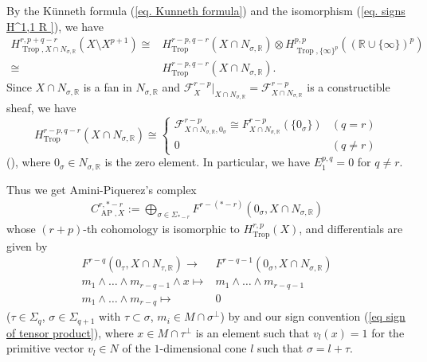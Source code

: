 \documentclass[12pt,a4]{amsart}
\def\R{\mathbb{R}}
\def\F{\mathscr{F}}
\def\AP{\mathop{\mathrm{AP}}\nolimits}
\def\Trop{\mathop{\mathrm{trop}}\nolimits}
\def\Trop{\mathop{\mathrm{Trop}}\nolimits}
\numberwithin{equation}{section}
\numberwithin{figure}{section}
\begin{document}
     By the K\"{u}nneth formula (\ref{eq. Kunneth formula}) 
     and the isomorphism (\ref{eq. signs H^1,1 R }), we have 
    \begin{align*}
         H^{r, p+q-r}_{\Trop, X \cap N_{\sigma,\R}  } 
          (X \setminus X^{p+1})   
          \cong  &
          H^{r-p, q-r}_{\Trop} ( X \cap N_{\sigma,\R}) 
          \otimes 
          H^{p, p}_{\Trop, \{ \infty \}^p } 
            (  ( \R \cup \{ \infty \} )^p ) \\
          \cong &
          H^{r-p, q-r}_{\Trop} ( X \cap N_{\sigma,\R}) 
            .
    \end{align*}
  Since $X \cap N_{\sigma,\R}$ is a fan in $N_{\sigma,\R}$ 
    and 
    $\F^{r-p}_X |_{X \cap N_{\sigma,\R}} 
       = \F^{r-p}_{X \cap N_{\sigma,\R}}$ is a constructible sheaf, 
    we have 
          $$H^{r-p, q-r}_{\Trop} ( X \cap N_{\sigma,\R}) 
          \cong 
         \begin{cases}
            \F^{r-p}_{X \cap N_{\sigma,\R} , 0_{\sigma} } 
             \cong 
                   F^{r-p}_{ X \cap N_{\sigma,\R} } 
                    ( \{ 0_\sigma \})  &  (q=r) \\ 
                      0 & (q \neq r) 
          \end{cases} $$
      (\cite[Proposition 3.1]{JellShawSmackaSuperformstropicalcohomologyandPoincarduality2019}),
     where $0_\sigma \in N_{\sigma,\R}$ is the zero element. 
      In particular, 
    we have $E_1^{p,q} =0 $ for $q \neq r$.

  Thus we get Amini-Piquerez's complex 
   \begin{align} \label{eq AP's complex}
    C^{r,*-r}_{\AP, X } 
     :=  \bigoplus_{ \sigma \in \Sigma_{*-r} }
     F^{r-(*-r)} (0_\sigma, X \cap N_{\sigma,\R}) 
     \end{align}
     whose 
    $(r+p)$-th cohomology is isomorphic to 
         $ H^{r,p}_{\Trop} (X) $, 
         and  
  differentials are 
  given by 
  \begin{align*}
    F^{r-q} (0_\tau, X \cap N_{\tau,\R}) 
      \to & F^{r-q-1} (0_\sigma, X \cap N_{\sigma,\R}) \\
      m_1 \wedge \dots \wedge m_{r-q-1}
       \wedge x
       \mapsto & 
      m_1 \wedge \dots \wedge m_{r-q-1}\\
      m_1 \wedge \dots \wedge m_{r-q} \mapsto & 0
  \end{align*}
   ($\tau \in \Sigma_q$, $\sigma \in \Sigma_{q+1}$ with $\tau \subset \sigma$, 
    $m_i \in M \cap \sigma^{\perp}$)
         by  and our sign convention (\ref{eq sign of tensor product}), 
    where
    $x \in M \cap \tau^{\perp}$ is an element such that $v_l(x)=1$ 
    for  the primitive vector $v_l \in N$ of  the $1$-dimensional cone  $l$
      such that $\sigma = l + \tau$. 
\end{document}
